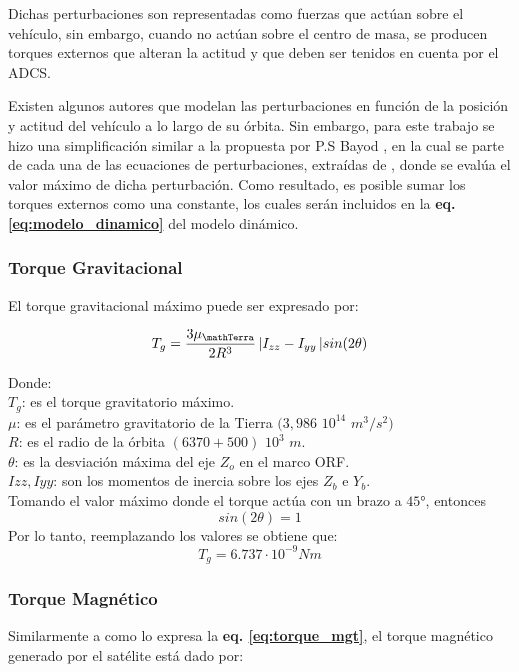 Dichas perturbaciones son representadas como fuerzas que actúan sobre el vehículo, sin embargo, cuando no actúan sobre el centro de masa, se producen torques externos que alteran la actitud y que deben ser tenidos en cuenta por el ADCS.

Existen algunos autores \cite{zapf2006robust}\cite{Andresen2005} que modelan las perturbaciones en función de la posición y actitud del vehículo a lo largo de su órbita. Sin embargo, para este trabajo se hizo una simplificación similar a la propuesta por P.S Bayod \cite{tes:Sorolla2019}, en la cual se parte de cada una de las ecuaciones de perturbaciones, extraídas de \cite{hughes2012spacecraft}, donde se evalúa el valor máximo de dicha perturbación. Como resultado, es posible sumar los torques externos como una constante, los cuales serán incluidos en la \textbf{eq. \ref{eq:modelo_dinamico}} del modelo dinámico.

\subsubsection{Torque Gravitacional}
\hfill \break
El torque gravitacional máximo puede ser expresado por:

\begin{equation}
T_g = \frac{3\mu_\mathTerra}{2R^3}\,\lvert I_{zz} -I_{yy}\,\rvert sin(2\theta)\label{eq:torque_grav}
\end{equation}

\noindent Donde:\\
$T_g$: es el torque gravitatorio máximo.\\
$\mu$: es el parámetro gravitatorio de la Tierra $(3,986$ $10^{14}$ $ m^3/s^2)$\\
$R$: es el radio de la órbita $(6370 + 500)$ $10^3$ $m$.\\
$\theta$: es la desviación máxima del eje $Z_o$ en el marco ORF.\\
$Izz, Iyy$: son los momentos de inercia sobre los ejes $Z_b$ e $Y_b$.\\

\noindent Tomando el valor máximo donde el torque actúa con un brazo a $45°$, entonces 
$$sin(2\theta) = 1$$
Por lo tanto, reemplazando los valores se obtiene que: 
$$T_g = 6.737\cdot10^{-9} Nm$$

\subsubsection{Torque Magnético}
\hfill \break
Similarmente a como lo expresa la \textbf{eq. \ref{eq:torque_mgt}}, el torque magnético generado por el satélite está dado por:

